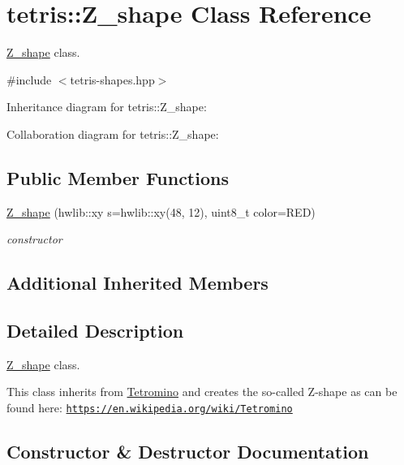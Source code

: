 \hypertarget{classtetris_1_1Z__shape}{}\section{tetris\+:\+:Z\+\_\+shape Class Reference}
\label{classtetris_1_1Z__shape}


\hyperlink{classtetris_1_1Z__shape}{Z\+\_\+shape} class.  




{\ttfamily \#include $<$tetris-\/shapes.\+hpp$>$}



Inheritance diagram for tetris\+:\+:Z\+\_\+shape\+:


Collaboration diagram for tetris\+:\+:Z\+\_\+shape\+:
\subsection*{Public Member Functions}
\begin{DoxyCompactItemize}
\item 
\hyperlink{classtetris_1_1Z__shape_a54b1b4d3200a25025932a340997390c2}{Z\+\_\+shape} (hwlib\+::xy s=hwlib\+::xy(48, 12), uint8\+\_\+t color=R\+ED)
\begin{DoxyCompactList}\small\item\em constructor \end{DoxyCompactList}\end{DoxyCompactItemize}
\subsection*{Additional Inherited Members}


\subsection{Detailed Description}
\hyperlink{classtetris_1_1Z__shape}{Z\+\_\+shape} class. 

This class inherits from \hyperlink{classtetris_1_1Tetromino}{Tetromino} and creates the so-\/called Z-\/shape as can be found here\+: \href{https://en.wikipedia.org/wiki/Tetromino}{\tt https\+://en.\+wikipedia.\+org/wiki/\+Tetromino} 

\subsection{Constructor \& Destructor Documentation}
\mbox{\label{classtetris_1_1Z__shape_a54b1b4d3200a25025932a340997390c2}} 
